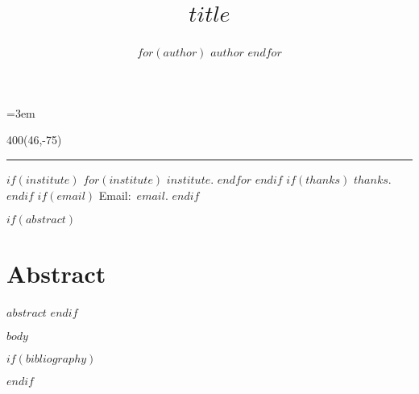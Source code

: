 \documentclass[letterpaper,twocolumn]{article}
\title{%
\vspace{-8ex}%
\begin{minipage}{\textwidth}%
\begin{flushleft}%
{\normalfont\fontsize{21}{0}\selectfont $title$}%
\end{flushleft}%
\end{minipage}%
\vspace{-1ex}%
}
\author{%
\begin{minipage}{\textwidth}%
\begin{flushleft}%
\hspace{-0.5em}%
{\normalfont\fontsize{12}{0}\selectfont $for(author)$ $author$ \quad $endfor$}%
\end{flushleft}%
\end{minipage}%
}
\date{\vspace{-2ex}}
\begin{document}
\fussy
\nowidow[2]
\parindent=3em
\parskip=0pt

\maketitle
\thispagestyle{fancy}

\textblockorigin{0in}{11in}
\setlength{\TPHorizModule}{1pt}
\setlength{\TPVertModule}{1pt}
\begin{textblock}{400}(46,-75)
    \parindent=0pt
    \scriptsize
    \normalfont
    \raggedright
    \baselineskip=9pt

    \hrule
    \vspace{1.5ex}

    $if(institute)$ $for(institute)$ $institute$. $endfor$ $endif$
    $if(thanks)$ $thanks$. $endif$
    $if(email)$ \phantom{*}Email:~\texttt{$email$}. $endif$
\end{textblock}

$if(abstract)$
\section*{Abstract}
$abstract$
$endif$

$body$

$if(bibliography)$
\footnotesize
\setlength{\bibsep}{0pt plus 0.3ex}


$endif$
\end{document}
